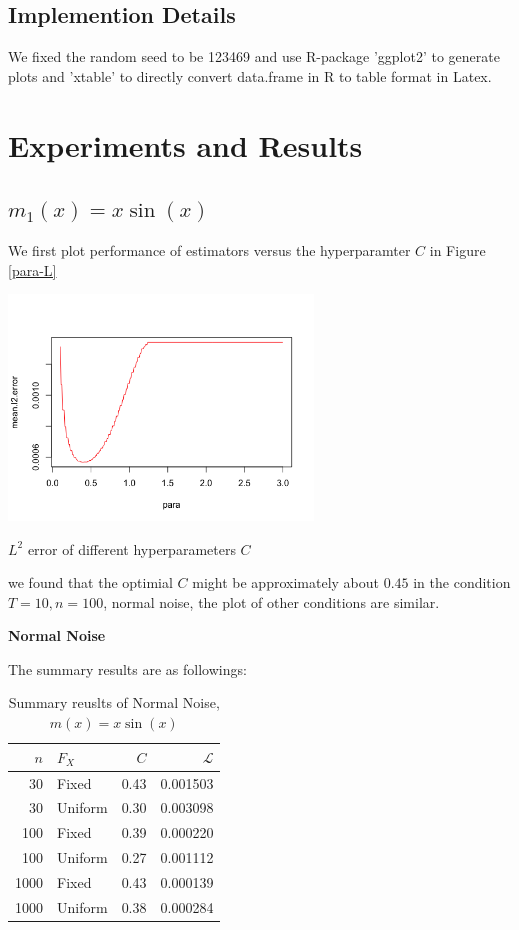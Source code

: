 \documentclass[twoside]{article}
\begin{document}
\subsection{Implemention Details}

We fixed the random seed to be 123469 and use R-package 'ggplot2' to generate plots and 'xtable' to directly convert data.frame in R to table format in Latex.

\section{Experiments and Results}

\subsection{$m_1(x)=x\sin(x)$}

We first plot performance of estimators versus the hyperparamter $C$ in Figure \ref{para-L}

\begin{center}
\makeatletter
\def\@captype{figure}
\makeatother
\includegraphics [height=6cm]{code/para.png}
\caption{$L^2$ error of different hyperparameters $C$}
\label{para-L}
\end{center}

we found that the optimial $C$ might be approximately about $0.45$ in the condition $T=10, n=100$, normal noise, the plot of other conditions are similar.

\noindent \textbf{Normal Noise}

The summary results are as followings:

\begin{table}[ht]
\centering
\caption{Summary reuslts of Normal Noise, $m(x)=x\sin(x)$}
\begin{tabular}{rlrr}
  \hline
  $n$ & $F_X$ & $C$ & $\mathcal{L}$ \\ 
  \hline
  30 & Fixed & 0.43 & 0.001503 \\ 
  30 & Uniform & 0.30 & 0.003098\\ 
  \hline
  100 & Fixed & 0.39 & 0.000220\\
  100 & Uniform & 0.27 & 0.001112\\
  \hline
  1000 & Fixed & 0.43 & 0.000139\\
  1000 & Uniform & 0.38 & 0.000284\\
  \hline
\end{tabular}
\label{cu}
\end{table}
\end{document}
